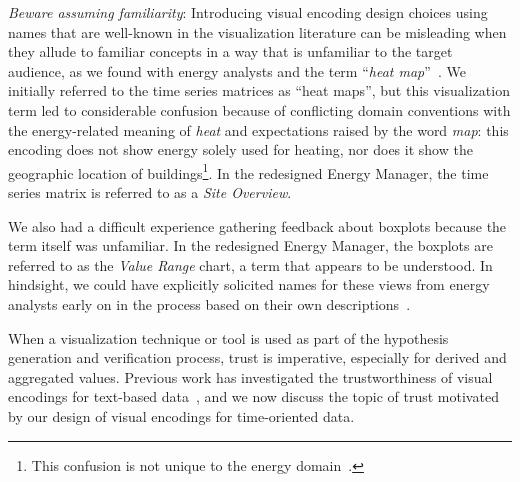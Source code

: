 {\it Beware assuming familiarity}: Introducing visual encoding design choices using names that are well-known in the visualization literature can be misleading when they allude to familiar concepts in a way that is unfamiliar to the target audience, as we found with energy analysts and the term ``{\it heat map}''~\cite{Field2015,Wilkinson2009}.
We initially referred to the time series matrices as ``heat maps'', but this visualization term led to considerable confusion because of conflicting domain conventions with the energy-related meaning of {\it heat} and expectations raised by the word {\it map}: this encoding does not show energy solely used for heating, nor does it show the geographic location of buildings\footnote{This confusion is not unique to the energy domain~\cite{Field2015,Wilkinson2009}.}. 
In the redesigned Energy Manager, the time series matrix is referred to as a {\it Site Overview}.

We also had a difficult experience gathering feedback about boxplots because the term itself was unfamiliar. 
In the redesigned Energy Manager, the boxplots are referred to as the {\it Value Range} chart, a term that appears to be understood. 
In hindsight, we could have explicitly solicited names for these views from energy analysts early on in the process based on their own descriptions~\cite{Metoyer2012}. 

 When a visualization technique or tool is used as part of the hypothesis generation and verification process, trust is imperative, especially for derived and aggregated values. 
Previous work has investigated the trustworthiness of visual encodings for text-based data~\cite{Chuang2012}, and we now discuss the topic of trust motivated by our design of visual encodings for time-oriented data.

